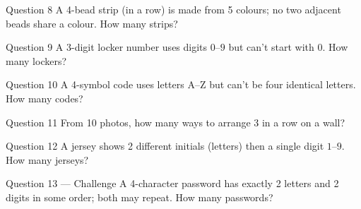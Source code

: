 \documentclass[11pt]{article}
\begin{document}
\begin{qbox}{Question 8}
A 4-bead strip (in a row) is made from 5 colours; no two adjacent beads share a colour. How many strips?\workspace{2.4cm}
\end{qbox}

\begin{qbox}{Question 9}
A 3-digit locker number uses digits $0$--$9$ but can't start with $0$. How many lockers?\workspace{2.4cm}
\end{qbox}

\begin{qbox}{Question 10}
A 4-symbol code uses letters A--Z but can't be four identical letters. How many codes?\workspace{2.4cm}
\end{qbox}

\begin{qbox}{Question 11}
From 10 photos, how many ways to arrange 3 in a row on a wall?\workspace{2.4cm}
\end{qbox}

\begin{qbox}{Question 12}
A jersey shows 2 different initials (letters) then a single digit $1$--$9$. How many jerseys?\workspace{2.4cm}
\end{qbox}

\begin{qbox}{Question 13 --- Challenge}
A 4-character password has exactly 2 letters and 2 digits in some order; both may repeat. How many passwords?\workspace{3.4cm}
\end{qbox}

\clearpage
{}
\end{document}
